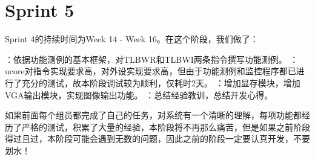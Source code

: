 \section{Sprint 5}

Sprint 4的持续时间为Week 14 - Week 16。在这个阶段，我们做了：
    
    \begin{enumerate}
        ：依据功能测例的基本框架，对TLBWR和TLBWI两条指令撰写功能测例。
        ：ucore对指令实现要求高，对外设实现要求高，但由于功能测例和监控程序都已进行了充分的测试，故本阶段调试较为顺利，仅耗时2天。
        ：增加显存模块，增加VGA输出模块，实现图像输出功能。
        ：总结经验教训，总结开发心得。
    \end{enumerate}

如果前面每个组员都完成了自己的任务，对系统有一个清晰的理解，每项功能都经历了严格的测试，积累了大量的经验，本阶段将不再那么痛苦，但是如果之前阶段得过且过，本阶段可能会遇到无数的问题，因此之前的阶段一定要认真开发，不要划水！





